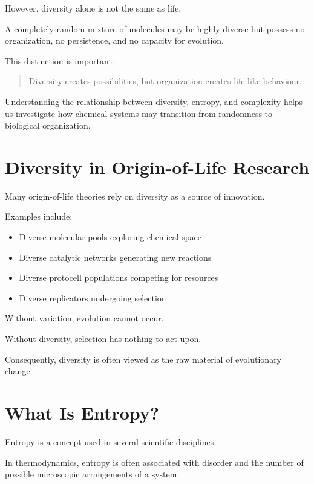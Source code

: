 \documentclass[
  oneside,
  openany]{book}
\providecommand{\tightlist}{%
  \setlength{\itemsep}{0pt}\setlength{\parskip}{0pt}}
\begin{document}
However, diversity alone is not the same as life.

A completely random mixture of molecules may be highly diverse but possess no organization, no persistence, and no capacity for evolution.

This distinction is important:

\begin{quote}
Diversity creates possibilities, but organization creates life-like behaviour.
\end{quote}

Understanding the relationship between diversity, entropy, and complexity helps us investigate how chemical systems may transition from randomness to biological organization.

\section{Diversity in Origin-of-Life Research}\label{diversity-in-origin-of-life-research}

Many origin-of-life theories rely on diversity as a source of innovation.

Examples include:

\begin{itemize}
\tightlist
\item
  Diverse molecular pools exploring chemical space
\item
  Diverse catalytic networks generating new reactions
\item
  Diverse protocell populations competing for resources
\item
  Diverse replicators undergoing selection
\end{itemize}

Without variation, evolution cannot occur.

Without diversity, selection has nothing to act upon.

Consequently, diversity is often viewed as the raw material of evolutionary change.

\section{What Is Entropy?}\label{what-is-entropy}

Entropy is a concept used in several scientific disciplines.

In thermodynamics, entropy is often associated with disorder and the number of possible microscopic arrangements of a system.
\end{document}
